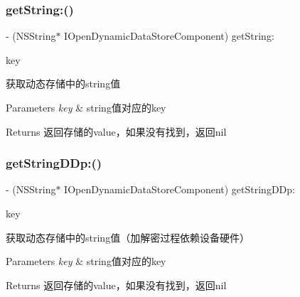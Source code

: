 \subsubsection{\texorpdfstring{get\+String\+:()}{getString:()}}
{\footnotesize\ttfamily -\/ (N\+S\+String$\ast$ I\+Open\+Dynamic\+Data\+Store\+Component) get\+String\+: \begin{DoxyParamCaption}\item[{(N\+S\+String $\ast$)}]{key }\end{DoxyParamCaption}}

获取动态存储中的string值 
\begin{DoxyParams}{Parameters}
{\em key} & string值对应的key \\
\hline
\end{DoxyParams}
\begin{DoxyReturn}{Returns}
返回存储的value，如果没有找到，返回nil 
\end{DoxyReturn}
\mbox{\label{protocol_i_open_dynamic_data_store_component_01-p_ae0985c7cbf2a962ebe070c647f328349}} 
\subsubsection{\texorpdfstring{get\+String\+D\+Dp\+:()}{getStringDDp:()}}
{\footnotesize\ttfamily -\/ (N\+S\+String$\ast$ I\+Open\+Dynamic\+Data\+Store\+Component) get\+String\+D\+Dp\+: \begin{DoxyParamCaption}\item[{(N\+S\+String $\ast$)}]{key }\end{DoxyParamCaption}}

获取动态存储中的string值（加解密过程依赖设备硬件） 
\begin{DoxyParams}{Parameters}
{\em key} & string值对应的key \\
\hline
\end{DoxyParams}
\begin{DoxyReturn}{Returns}
返回存储的value，如果没有找到，返回nil 
\end{DoxyReturn}
\mbox{\label{protocol_i_open_dynamic_data_store_component_01-p_a2764a8c0ba6204774d7f2fb697d49546}} 
